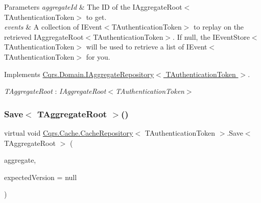 \begin{DoxyParams}{Parameters}
{\em aggregate\+Id} & The ID of the I\+Aggregate\+Root$<$\+T\+Authentication\+Token$>$ to get.\\
\hline
{\em events} & A collection of I\+Event$<$\+T\+Authentication\+Token$>$ to replay on the retrieved I\+Aggregate\+Root$<$\+T\+Authentication\+Token$>$. If null, the I\+Event\+Store$<$\+T\+Authentication\+Token$>$ will be used to retrieve a list of I\+Event$<$\+T\+Authentication\+Token$>$ for you. \\
\hline
\end{DoxyParams}


Implements \hyperlink{interfaceCqrs_1_1Domain_1_1IAggregateRepository_a890633fddbd05bd3b9e9968a2de095bb_a890633fddbd05bd3b9e9968a2de095bb}{Cqrs.\+Domain.\+I\+Aggregate\+Repository$<$ T\+Authentication\+Token $>$}.

\begin{Desc}
\item[Type Constraints]\begin{description}
\item[{\em T\+Aggregate\+Root} : {\em I\+Aggregate\+Root$<$T\+Authentication\+Token$>$}]\end{description}
\end{Desc}
\mbox{\label{classCqrs_1_1Cache_1_1CacheRepository_a69df7ee1dc2e4cd38431ab987655eab3_a69df7ee1dc2e4cd38431ab987655eab3}} 
\subsubsection{\texorpdfstring{Save$<$ T\+Aggregate\+Root $>$()}{Save< TAggregateRoot >()}}
{\footnotesize\ttfamily virtual void \hyperlink{classCqrs_1_1Cache_1_1CacheRepository}{Cqrs.\+Cache.\+Cache\+Repository}$<$ T\+Authentication\+Token $>$.Save$<$ T\+Aggregate\+Root $>$ (\begin{DoxyParamCaption}\item[{T\+Aggregate\+Root}]{aggregate,  }\item[{int?}]{expected\+Version = {\ttfamily null} }\end{DoxyParamCaption})\hspace{0.3cm}{\ttfamily [virtual]}}



